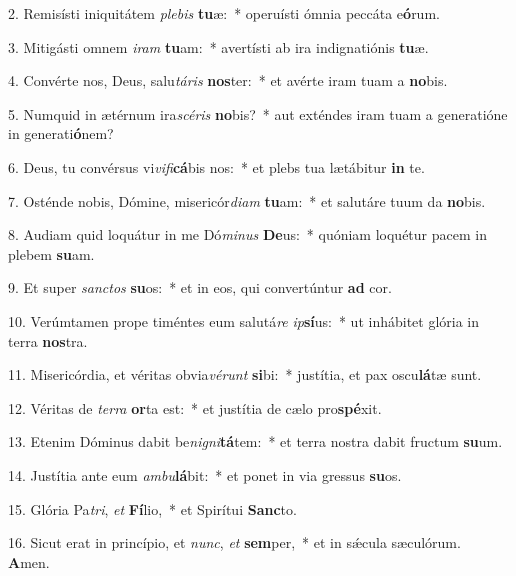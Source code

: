 2. Remisísti iniquitátem \textit{ple}\textit{bis} \textbf{tu}æ:~*  operuísti ómnia peccáta e\textbf{ó}rum.\

3. Mitigásti omnem \textit{i}\textit{ram} \textbf{tu}am:~*  avertísti ab ira indignatiónis \textbf{tu}æ.\

4. Convérte nos, Deus, salu\textit{tá}\textit{ris} \textbf{nos}ter:~*  et avérte iram tuam a \textbf{no}bis.\

5. Numquid in ætérnum ira\textit{scé}\textit{ris} \textbf{no}bis?~*  aut exténdes iram tuam a generatióne in generati\textbf{ó}nem?\

6. Deus, tu convérsus vi\textit{vi}\textit{fi}\textbf{cá}bis nos:~*  et plebs tua lætábitur \textbf{in} te.\

7. Osténde nobis, Dómine, misericór\textit{di}\textit{am} \textbf{tu}am:~*  et salutáre tuum da \textbf{no}bis.\

8. Audiam quid loquátur in me Dó\textit{mi}\textit{nus} \textbf{De}us:~*  quóniam loquétur pacem in plebem \textbf{su}am.\

9. Et super \textit{sanc}\textit{tos} \textbf{su}os:~*  et in eos, qui convertúntur \textbf{ad} cor.\

10. Verúmtamen prope timéntes eum salutá\textit{re} \textit{ip}\textbf{sí}us:~*  ut inhábitet glória in terra \textbf{nos}tra.\

11. Misericórdia, et véritas obvia\textit{vé}\textit{runt} \textbf{si}bi:~*  justítia, et pax oscu\textbf{lá}tæ sunt.\

12. Véritas de \textit{ter}\textit{ra} \textbf{or}ta est:~*  et justítia de cælo pro\textbf{spé}xit.\

13. Etenim Dóminus dabit be\textit{ni}\textit{gni}\textbf{tá}tem:~*  et terra nostra dabit fructum \textbf{su}um.\

14. Justítia ante eum \textit{am}\textit{bu}\textbf{lá}bit:~*  et ponet in via gressus \textbf{su}os.\

15. Glória Pa\textit{tri}, \textit{et} \textbf{Fí}lio,~*  et Spirítui \textbf{Sanc}to.\

16. Sicut erat in princípio, et \textit{nunc}, \textit{et} \textbf{sem}per,~*  et in sǽcula sæculórum. \textbf{A}men.\

